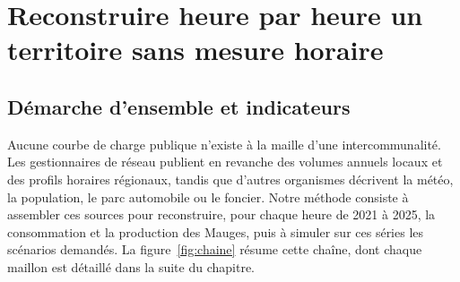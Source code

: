\chapter[Méthode]{Reconstruire heure par heure un territoire sans mesure horaire}
\label{chap:methode}

\section{Démarche d'ensemble et indicateurs}
\label{sec:demarche}

Aucune courbe de charge publique n'existe à la maille d'une intercommunalité. Les gestionnaires de réseau publient en revanche des volumes annuels locaux et des profils horaires régionaux, tandis que d'autres organismes décrivent la météo, la population, le parc automobile ou le foncier. Notre méthode consiste à assembler ces sources pour reconstruire, pour chaque heure de 2021 à 2025, la consommation et la production des Mauges, puis à simuler sur ces séries les scénarios demandés. La figure~\ref{fig:chaine} résume cette chaîne, dont chaque maillon est détaillé dans la suite du chapitre.

